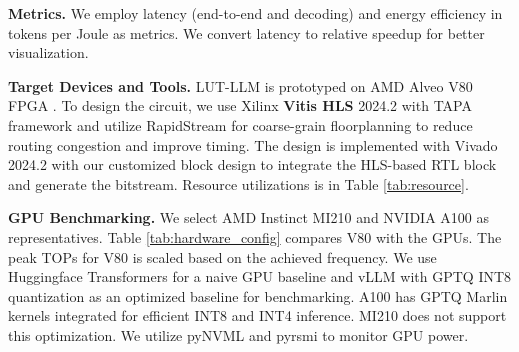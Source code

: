 \documentclass[conference]{IEEEtran}
\begin{document}
\noindent \textbf{Metrics.} We employ latency (end-to-end and decoding) and energy efficiency in tokens per Joule as metrics. We convert latency to relative speedup for better visualization. 

\noindent \textbf{Target Devices and Tools.} LUT-LLM is prototyped on AMD Alveo V80 FPGA \cite{amd2024alveov80}. To design the circuit, we use Xilinx \textbf{Vitis HLS} 2024.2 with TAPA framework \cite{guo2023tapa} and utilize RapidStream \cite{guo2022rapidstream, guo2021autobridge} for coarse-grain floorplanning to reduce routing congestion and improve timing. The design is implemented with Vivado 2024.2 with our customized block design to integrate the HLS-based RTL block and generate the bitstream. Resource utilizations is in Table \ref{tab:resource}.


\noindent \textbf{GPU Benchmarking.} We select AMD Instinct MI210 \cite{amd2025mi210} and NVIDIA A100 \cite{nvidia2021a100} as representatives. Table \ref{tab:hardware_config} compares V80 with the GPUs. The peak TOPs for V80 is scaled based on the achieved frequency. We use Huggingface Transformers for a naive GPU baseline and vLLM \cite{kwon2023efficient} with GPTQ \cite{frantar2022gptq} INT8 quantization as an optimized baseline for benchmarking. A100 has GPTQ Marlin kernels \cite{frantar2025marlin} integrated for efficient INT8 and INT4 inference. MI210 does not support this optimization. We utilize pyNVML \cite{nvidia-ml-py} and pyrsmi to monitor GPU power.

\begin{table}[t] 
\setlength{\tabcolsep}{4pt}
\centering
\caption{Hardware Configuration of FPGA and GPUs}
\label{tab:hardware_config}
\end{table}
\end{document}
